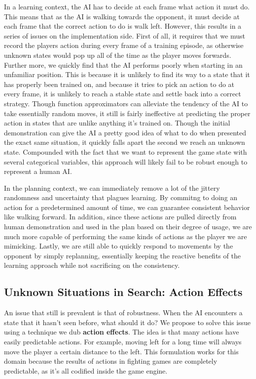\documentclass{article}
\begin{document}
In a learning context, the AI has to decide at each frame what action it must do. This means that as the AI is walking towards the opponent, it must decide at each frame that the correct action to do is walk left. However, this results in a series of issues on the implementation side. First of all, it requires that we must record the players action during every frame of a training episode, as otherwise unknown states would pop up all of the time as the player moves forwards. Further more, we quickly find that the AI performs poorly when starting in an unfamiliar position. This is because it is unlikely to find its way to a state that it has properly been trained on, and because it tries to pick an action to do at every frame, it is unlikely to reach a stable state and settle back into a correct strategy. Though function approximators can alleviate the tendency of the AI to take essentially random moves, it still is fairly ineffective at predicting the proper action in states that are unlike anything it's trained on. Though the initial demonstration can give the AI a pretty good idea of what to do when presented the exact same situation, it quickly falls apart the second we reach an unknown state. Compounded with the fact that we want to represent the game state with several categorical variables, this approach will likely fail to be robust enough to represent a human AI.

In the planning context, we can immediately remove a lot of the jittery randomness and uncertainty that plagues learning. By commitng to doing an action for a predetermined amount of time, we can guarantee consistent behavior like walking forward. In addition, since these actions are pulled directly from human demonstration and used in the plan based on their degree of usage, we are much more capable of performing the same kinds of actions as the player we are mimicking. Lastly, we are still able to quickly respond to movements by the opponent by simply replanning, essentially keeping the reactive benefits of the learning approach while not sacrificing on the consistency. 

\subsection{Unknown Situations in Search: Action Effects}

An issue that still is prevalent is that of robustness. When the AI encounters a state that it hasn't seen before, what should it do? We propose to solve this issue using a technique we dub \textbf{action effects}. The idea is that many actions have easily predictable actions. For example, moving left for a long time will always move the player a certain distance to the left. This formulation works for this domain because the results of actions in fighting games are completely predictable, as it's all codified inside the game engine. 
\end{document}

